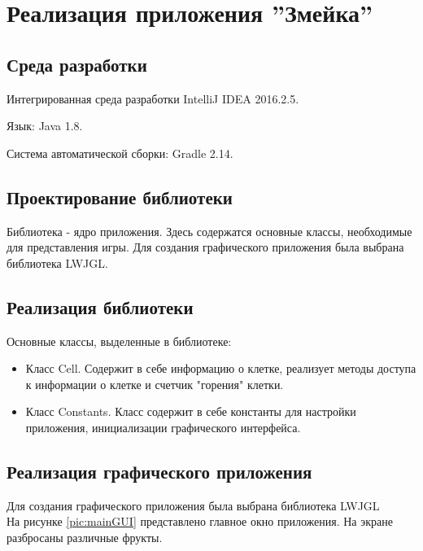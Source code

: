 \documentclass[a4paper]{article}
\begin{document}
\section{Реализация приложения ''Змейка''}

\subsection{Среда разработки}

\noindent Интегрированная среда разработки IntelliJ IDEA 2016.2.5. 

\noindent Язык: Java 1.8.

\noindent Система автоматической сборки: Gradle 2.14.

\subsection{Проектирование библиотеки}
Библиотека  - ядро приложения. Здесь содержатся основные классы, необходимые для представления игры. Для создания графического приложения была выбрана библиотека LWJGL.


\subsection{Реализация библиотеки}
\noindent Основные классы, выделенные в библиотеке:
\begin{itemize}

\item Класс Cell. Содержит в себе информацию о клетке, реализует методы доступа к информации о клетке и счетчик "горения" клетки.

\item Класс Constants. Класс содержит в себе константы для настройки приложения, инициализации графического интерфейса.

\end{itemize}
\subsection{Реализация графического приложения}
Для создания графического приложения была выбрана библиотека LWJGL \\

На рисунке \ref{pic:mainGUI} представлено главное окно приложения. На экране разбросаны различные фрукты.
\end{document}
